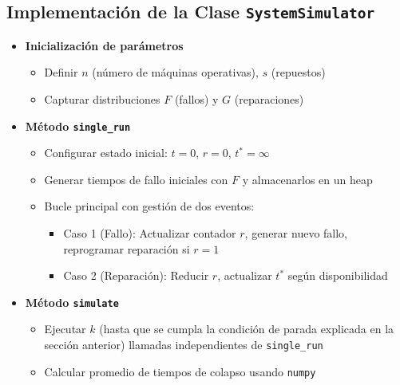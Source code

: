 \documentclass[a4paper, 12pt]{article}
\begin{document}
\subsection*{Implementación de la Clase \texttt{SystemSimulator}}
\begin{itemize}
    \item \textbf{Inicialización de parámetros}
    \begin{itemize}
        \item Definir $n$ (número de máquinas operativas), $s$ (repuestos)
        \item Capturar distribuciones $F$ (fallos) y $G$ (reparaciones)
    \end{itemize}
    
    \item \textbf{Método \texttt{single\_run}}
    \begin{itemize}
        \item Configurar estado inicial: $t=0$, $r=0$, $t^*=\infty$
        \item Generar tiempos de fallo iniciales con $F$ y almacenarlos en un heap
        \item Bucle principal con gestión de dos eventos:
        \begin{itemize}
            \item Caso 1 (Fallo): Actualizar contador $r$, generar nuevo fallo, reprogramar reparación si $r=1$
            \item Caso 2 (Reparación): Reducir $r$, actualizar $t^*$ según disponibilidad
        \end{itemize}
    \end{itemize}
    
    \item \textbf{ Método \texttt{simulate}}
    \begin{itemize}
        \item Ejecutar $k$ (hasta que se cumpla la condición de parada explicada en la sección anterior) llamadas independientes de \texttt{single\_run}
        \item Calcular promedio de tiempos de colapso usando \texttt{numpy}
    \end{itemize}
\end{itemize}
\end{document}
